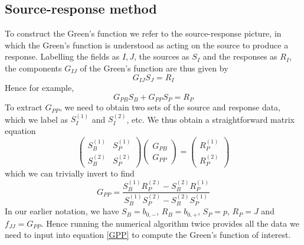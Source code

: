 \documentclass[aps,preprint,nofootinbib,preprintnumbers,eqsecnum,superscriptaddress]{revtex4}
\begin{document}
\begin{appendix}
\subsection{Source-response method}
To construct the Green's function we refer to the source-response picture, in which the Green's function is understood as acting on the source to produce a response. Labelling the fields as $I, J$, the sources as $S_I$ and the responses as $R_I$, the components $G_{IJ}$ of the Green's function are thus given by
\begin{equation}
	G_{IJ} S_J = R_I
\end{equation}
Hence for example, 
\begin{equation}
	G_{PB} S_B + G_{PP} S_P = R_P
\end{equation}
To extract $G_{PP}$, we need to obtain two sets of the source and response data, which we label as $S_I^{(1)}$ and $S_I^{(2)}$, etc. We thus obtain a straightforward matrix equation
\begin{equation}
	\begin{pmatrix}
		S_B^{(1)} & S_P^{(1)} \\
		S_B^{(2)} & S_P^{(2)}
	\end{pmatrix}
	\begin{pmatrix}
		G_{PB}\\
		G_{PP}
	\end{pmatrix}
	=
	\begin{pmatrix}
		R_P^{(1)}\\
		R_P^{(2)}
	\end{pmatrix}
\end{equation}
which we can trivially invert to find
\begin{equation}
	G_{PP} = \frac{S_B^{(1)} R_P^{(2)} - S_B^{(2)} R_P^{(1)}}{S_B^{(1)} S_P^{(2)} - S_B^{(2)} S_P^{(1)}}	\label{GPP}
\end{equation}
In our earlier notation, we have $S_B = b_{0, -}$, $R_B = b_{0, +}$, $S_P = p$, $R_P = J$ and $f_{JJ} = G_{PP}$. Hence running the numerical algorithm twice provides all the data we need to input into equation \ref{GPP} to compute the Green's function of interest.

\end{appendix}
\end{document}
